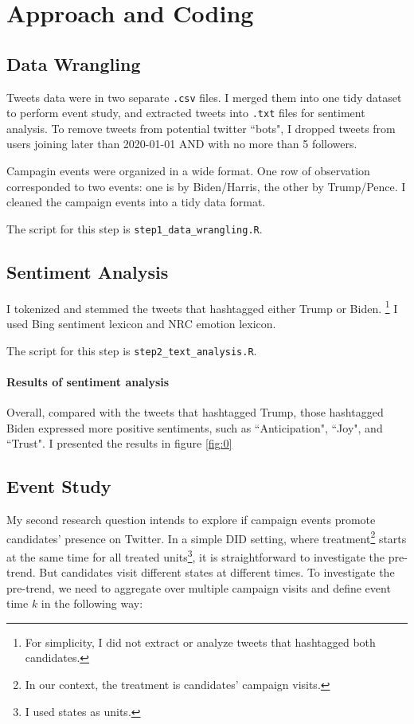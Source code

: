\documentclass{article}
\begin{document}
\section{Approach and Coding}

\subsection{Data Wrangling}
	
	Tweets data were in two separate \verb|.csv| files. I merged them into one tidy dataset to perform event study, and extracted tweets into \verb|.txt| files for sentiment analysis.  To remove tweets from potential twitter ``bots", I dropped tweets from users joining later than 2020-01-01 AND with no more than 5 followers.
	
	Campagin events were organized in a wide format. One row of observation corresponded to two events: one is by Biden/Harris, the other by Trump/Pence. I cleaned the campaign events into a tidy data format. 
	
	The script for this step is \verb|step1_data_wrangling.R|.
	
\subsection{Sentiment Analysis}
	
	I tokenized and stemmed the tweets that hashtagged either Trump or Biden. \footnote{For simplicity, I did not extract or analyze tweets that hashtagged both candidates.} I used Bing sentiment lexicon and NRC emotion lexicon. 
	
	The script for this step is \verb|step2_text_analysis.R|.
	
	\paragraph{Results of sentiment analysis} Overall, compared with the tweets that hashtagged Trump, those hashtagged Biden expressed more positive sentiments, such as ``Anticipation", ``Joy", and ``Trust". I presented the results in figure \ref{fig:0}

\subsection{Event Study}
	
	My second research question intends to explore if campaign events promote candidates' presence on Twitter. In a simple DID setting, where treatment\footnote{In our context, the treatment is candidates' campaign visits.} starts at the same time for all
	treated units\footnote{I used states as units.}, it is straightforward to investigate the pre-trend. But candidates visit different states at different times. To investigate the pre-trend, we need to aggregate over multiple campaign visits and define event time $k$ in the following way:
	
\end{document}
